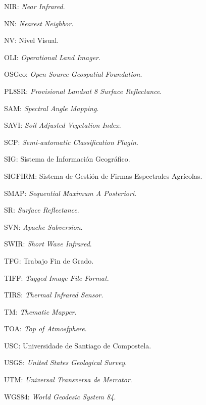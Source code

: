NIR: \textit{Near Infrared}.

NN: \textit{Nearest Neighbor}.

NV: Nivel Visual.

OLI: \textit{Operational Land Imager}.

OSGeo: \textit{Open Source Geospatial Foundation}.

PL8SR: \textit{Provisional Landsat 8 Surface Reflectance}.

SAM: \textit{Spectral Angle Mapping}.

SAVI: \textit{Soil Adjusted Vegetation Index}.

SCP: \textit{Semi-automatic Classification Plugin}.

SIG: Sistema de Información Geográfico.

SIGFIRM: Sistema de Gestión de Firmas Espectrales Agrícolas.

SMAP: \textit{Sequential Maximum A Posteriori}.

SR: \textit{Surface Reflectance}.

SVN: \textit{Apache Subversion}.

SWIR: \textit{Short Wave Infrared}.

TFG: Trabajo Fin de Grado.

TIFF: \textit{Tagged Image File Format}.

TIRS: \textit{Thermal Infrared Sensor}.

TM: \textit{Thematic Mapper}.

TOA: \textit{Top of Atmosfphere}.

USC: Universidade de Santiago de Compostela.

USGS: \textit{United States Geological Survey}.

UTM: \textit{Universal Transversa de Mercator}.

WGS84: \textit{World Geodesic System 84}.
